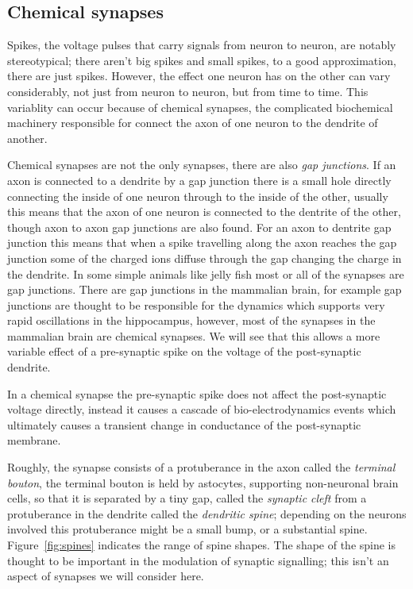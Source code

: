 \documentclass[11pt,a4paper]{scrartcl}
\begin{document}
\subsection*{Chemical synapses}

Spikes, the voltage pulses that carry signals from neuron to neuron,
are notably stereotypical; there aren't big spikes and small spikes,
to a good approximation, there are just spikes. However, the effect
one neuron has on the other can vary considerably, not just from
neuron to neuron, but from time to time. This variablity can occur
because of chemical synapses, the complicated biochemical machinery
responsible for connect the axon of one neuron to the dendrite of
another. 

Chemical synapses are not the only synapses, there are also
\textsl{gap junctions}. If an axon is connected to a dendrite by a gap
junction there is a small hole directly connecting the inside of one
neuron through to the inside of the other, usually this means that the
axon of one neuron is connected to the dentrite of the other, though
axon to axon gap junctions are also found. For an axon to dentrite gap
junction this means that when a spike travelling along the axon
reaches the gap junction some of the charged ions diffuse through the
gap changing the charge in the dendrite. In some simple animals like
jelly fish most or all of the synapses are gap junctions. There are
gap junctions in the mammalian brain, for example gap junctions are
thought to be responsible for the dynamics which supports very rapid
oscillations in the hippocampus, however, most of the synapses in the
mammalian brain are chemical synapses. We will see that this allows a
more variable effect of a pre-synaptic spike on the voltage of the
post-synaptic dendrite.

In a chemical synapse the pre-synaptic spike does not affect the
post-synaptic voltage directly, instead it causes a cascade of
bio-electrodynamics events which ultimately causes a transient change
in conductance of the post-synaptic membrane. 

Roughly, the synapse consists of a protuberance in the axon called the
\textsl{terminal bouton}, the terminal bouton is held by astocytes,
supporting non-neuronal brain cells, so that it is separated by a tiny
gap, called the \textsl{synaptic cleft} from a protuberance in the
dendrite called the \textsl{dendritic spine}; depending on the neurons
involved this protuberance might be a small bump, or a substantial
spine. Figure~\ref{fig:spines} indicates the range of spine
shapes. The shape of the spine is thought to be important in the
modulation of synaptic signalling; this isn't an aspect of synapses we
will consider here.
\end{document}
